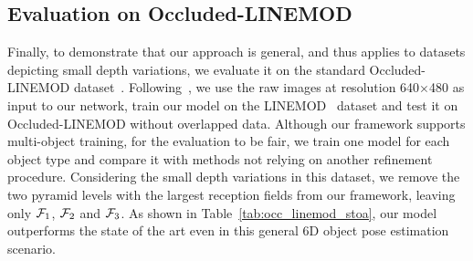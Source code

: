 % 



\subsection{Evaluation on Occluded-LINEMOD}

Finally, to demonstrate that our approach is general, and thus applies to datasets depicting small depth variations, we evaluate it on the standard Occluded-LINEMOD dataset~\cite{Krull15}. Following~\cite{Hu20a}, we use the raw images at resolution 640$\times$480 as input to our network, train our model on the LINEMOD~\cite{Hinterstoisser12b} dataset and test it on Occluded-LINEMOD without overlapped data. Although our framework supports multi-object training, for the evaluation to be fair, we train one model for each object type and compare it with methods not relying on another refinement procedure.
Considering the small depth variations in this dataset, we remove the two pyramid levels with the largest reception fields from our framework, leaving only ${\cal F}_1$, ${\cal F}_2$ and ${\cal F}_3$. As shown in Table~\ref{tab:occ_linemod_stoa}, our model outperforms the state of the art even in this general 6D object pose estimation scenario.


